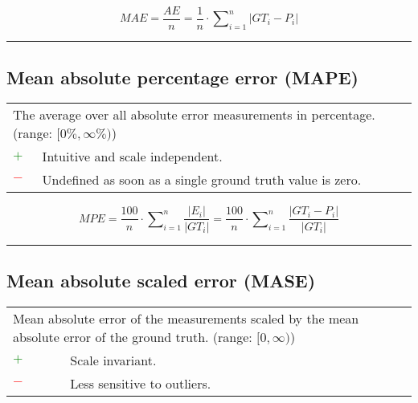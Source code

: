 \documentclass{article}
\begin{document}
\begin{equation}
	\textit{MAE} = \dfrac{\textit{AE}}{n} = \dfrac{1}{n} \cdot \sum\nolimits_{i = 1}^n |\textit{GT}_i - P_i|
%
	\label{equation:MAE}
\end{equation}

\hrule


\subsection[Mean absolute percentage error (MAPE)]{Mean absolute percentage error (MAPE) \cite{armstrong1992error, hyndman2006another}}

\begin{table}[H]\centering
	\begin{tabular}{m{}m{}}
		\multicolumn{2}{m{0.95\textwidth}}{The average over all absolute error measurements in percentage. (range: $[0\%, \infty\%)$)} \\
		\textcolor{Green}{$+$} & Intuitive and scale independent. \\
		\textcolor{Red}{$-$}   & Undefined as soon as a single ground truth value is zero.
	\end{tabular}
\end{table}

\begin{equation}
	\textit{MPE} = \dfrac{100}{n} \cdot \sum\nolimits_{i = 1}^n \dfrac{|E_i|}{|\textit{GT}_i|} = \dfrac{100}{n} \cdot \sum\nolimits_{i = 1}^n \dfrac{|\textit{GT}_i - P_i|}{|\textit{GT}_i|}
%
	\label{equation:MAPE}
\end{equation}

\hrule


\subsection[Mean absolute scaled error (MASE)]{Mean absolute scaled error (MASE) \cite{hyndman2006another, mohan2018deep}}

\begin{table}[H]\centering
	\begin{tabular}{m{}m{}}
		\multicolumn{2}{m{0.95\textwidth}}{Mean absolute error of the measurements scaled by the mean absolute error of the ground truth. (range: $[0, \infty)$)} \\
		\textcolor{Green}{$+$} & Scale invariant. \\
		\textcolor{Red}{$-$}   & Less sensitive to outliers.
	\end{tabular}
\end{table}
\end{document}
